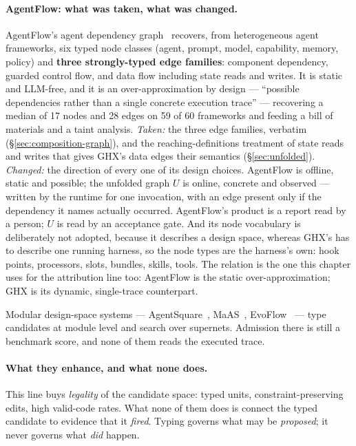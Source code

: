 \paragraph{AgentFlow: what was taken, what was changed.}
AgentFlow's agent dependency graph~\cite{agentflow} recovers, from
heterogeneous agent frameworks, six typed node classes (agent, prompt,
model, capability, memory, policy) and \textbf{three strongly-typed edge
families}: component dependency, guarded control flow, and data flow
including state reads and writes. It is static and LLM-free, and it is
an over-approximation by design --- ``possible dependencies rather than a
single concrete execution trace'' --- recovering a median of 17 nodes
and 28 edges on 59 of 60 frameworks and feeding a bill of materials and a
taint analysis. \emph{Taken:} the three edge families, verbatim
(\S\ref{sec:composition-graph}), and the reaching-definitions treatment
of state reads and writes that gives GHX's data edges their semantics
(\S\ref{sec:unfolded}). \emph{Changed:} the direction of every one of
its design choices. AgentFlow is offline, static and possible; the
unfolded graph $U$ is online, concrete and observed --- written by the
runtime for one invocation, with an edge present only if the dependency
it names actually occurred. AgentFlow's product is a report read by a
person; $U$ is read by an acceptance gate. And its node vocabulary is
deliberately not adopted, because it describes a design space, whereas
GHX's has to describe one running harness, so the node types are the
harness's own: hook points, processors, slots, bundles, skills, tools.
The relation is the one this chapter uses for the attribution line too:
AgentFlow is the static over-approximation; GHX is its dynamic,
single-trace counterpart.

Modular design-space systems --- AgentSquare~\cite{agentsquare},
MaAS~\cite{maas}, EvoFlow~\cite{evoflow} --- type candidates at module
level and search over supernets. Admission there is still a benchmark
score, and none of them reads the executed trace.

\paragraph{What they enhance, and what none does.} This line buys
\emph{legality} of the candidate space: typed units, constraint-preserving
edits, high valid-code rates. What none of them does is connect the typed
candidate to evidence that it \emph{fired}. Typing governs what may be
\emph{proposed}; it never governs what \emph{did} happen.

